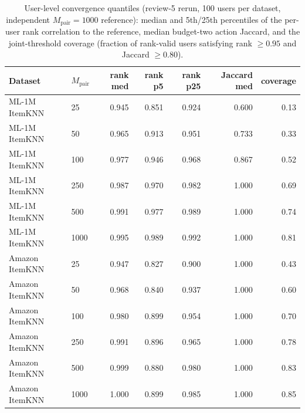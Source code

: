 \begin{table}[!htbp]\centering\scriptsize\setlength{\tabcolsep}{3pt}
\caption{User-level convergence quantiles (review-5 rerun, 100 users per
dataset, independent $M_{\mathrm{pair}}=1000$ reference): median and 5th/25th
percentiles of the per-user rank correlation to the reference, median
budget-two action Jaccard, and the joint-threshold coverage (fraction of
rank-valid users satisfying rank $\ge0.95$ and Jaccard $\ge0.80$).}
\label{tab:review5-convergence}
\begin{tabular}{@{}llrrrrr@{}}
\toprule
Dataset & $M_{\mathrm{pair}}$ & rank med & rank p5 & rank p25 & Jaccard med & coverage \\
\midrule
ML-1M ItemKNN & 25 & 0.945 & 0.851 & 0.924 & 0.600 & 0.13 \\
ML-1M ItemKNN & 50 & 0.965 & 0.913 & 0.951 & 0.733 & 0.33 \\
ML-1M ItemKNN & 100 & 0.977 & 0.946 & 0.968 & 0.867 & 0.52 \\
ML-1M ItemKNN & 250 & 0.987 & 0.970 & 0.982 & 1.000 & 0.69 \\
ML-1M ItemKNN & 500 & 0.991 & 0.977 & 0.989 & 1.000 & 0.74 \\
ML-1M ItemKNN & 1000 & 0.995 & 0.989 & 0.992 & 1.000 & 0.81 \\
Amazon ItemKNN & 25 & 0.947 & 0.827 & 0.900 & 1.000 & 0.43 \\
Amazon ItemKNN & 50 & 0.968 & 0.840 & 0.937 & 1.000 & 0.60 \\
Amazon ItemKNN & 100 & 0.980 & 0.899 & 0.954 & 1.000 & 0.70 \\
Amazon ItemKNN & 250 & 0.991 & 0.896 & 0.965 & 1.000 & 0.78 \\
Amazon ItemKNN & 500 & 0.999 & 0.880 & 0.980 & 1.000 & 0.83 \\
Amazon ItemKNN & 1000 & 1.000 & 0.899 & 0.985 & 1.000 & 0.85 \\
\bottomrule
\end{tabular}
\end{table}